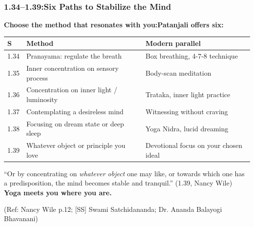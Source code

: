 \begin{frame}[fragile]\frametitle{1.34–1.39:Six Paths to Stabilize the Mind}

\begin{center}
{\normalsize \textbf{Choose the method that resonates with you:Patanjali offers six:}}
\end{center}

\begin{center}
{\small
\begin{tabular}{|p{0.8cm}|p{3cm}|p{3.2cm}|}
\hline
\textbf{S} & \textbf{Method} & \textbf{Modern parallel} \\
\hline
1.34 & Pranayama: regulate the breath & Box breathing, 4-7-8 technique \\
1.35 & Inner concentration on sensory process & Body-scan meditation \\
1.36 & Concentration on inner light / luminosity & Trataka, inner light practice \\
1.37 & Contemplating a desireless mind & Witnessing without craving \\
1.38 & Focusing on dream state or deep sleep & Yoga Nidra, lucid dreaming \\
1.39 & Whatever object or principle you love & Devotional focus on your chosen ideal \\
\hline
\end{tabular}
}
\end{center}

\vspace{2mm}
\begin{center}
{\small ``Or by concentrating on \emph{whatever object} one may like, or towards which one has a predisposition, the mind becomes stable and tranquil.'' (1.39, Nancy Wile)\\
\textbf{Yoga meets you where you are.}}
\end{center}

\tiny{(Ref: Nancy Wile p.12; [SS] Swami Satchidananda; Dr. Ananda Balayogi Bhavanani)}

\end{frame}

